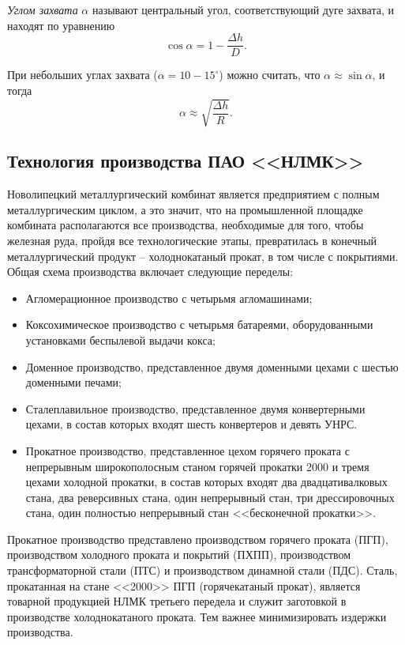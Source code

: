 \textit{Углом захвата} $\alpha$ называют центральный угол, соответствующий дуге захвата, и находят по уравнению $$\cos \alpha = 1 - \frac{\Delta h}{D}.$$

При небольших углах захвата ($\alpha = 10 - 15^\circ$) можно считать, что $\alpha \approx \sin \alpha$, и тогда $$\alpha \approx \sqrt{\frac{\Delta h}{R}}.$$


\subsection{Технология производства ПАО <<НЛМК>>}

Новолипецкий металлургический комбинат является предприятием с полным металлургическим циклом, а это значит, что на промышленной площадке комбината располагаются все производства, необходимые для того, чтобы железная руда, пройдя все технологические этапы, превратилась в конечный металлургический продукт – холоднокатаный прокат, в том числе с покрытиями.
Общая схема производства включает следующие переделы: 

\begin{itemize}
\item Агломерационное производство с четырьмя агломашинами;
\item Коксохимическое производство с четырьмя батареями, оборудованными установками беспылевой выдачи кокса;
\item Доменное производство, представленное двумя доменными цехами с шестью доменными печами;
\item Сталеплавильное производство, представленное двумя конвертерными цехами, в состав которых входят шесть конвертеров и девять УНРС.
\item Прокатное производство, представленное цехом горячего проката с непрерывным широкополосным станом горячей прокатки 2000 и тремя цехами холодной прокатки, в состав которых входят два двадцативалковых стана, два реверсивных стана, один непрерывный стан, три дрессировочных стана, один полностью непрерывный стан <<бесконечной прокатки>>.
\end{itemize}


Прокатное производство представлено производством горячего проката (ПГП), производством холодного проката и покрытий (ПХПП), производством трансформаторной стали (ПТС) и производством динамной стали (ПДС). Сталь, прокатанная на стане <<2000>> ПГП (горячекатаный прокат), является товарной продукцией НЛМК третьего передела и служит заготовкой в производстве холоднокатаного проката. Тем важнее минимизировать издержки производства.

